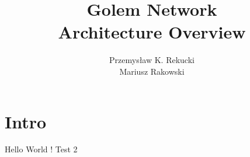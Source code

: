 \documentclass[12pt]{article}
\author{Przemysław K. Rekucki \\ Mariusz Rakowski}
\title{Golem Network \\ Architecture Overview}
\begin{document}
\maketitle{}

\section{Intro}

Hello World !
Test 2
\end{document}
